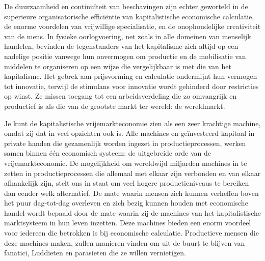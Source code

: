De duurzaamheid en continuïteit van beschavingen zijn echter geworteld in de superieure organisatorische efficiëntie van kapitalistische economische calculatie, de enorme voordelen van vrijwillige specialisatie, en de onophoudelijke creativiteit van de mens. In fysieke oorlogvoering, net zoals in alle domeinen van menselijk handelen, bevinden de tegenstanders van het kapitalisme zich altijd op een nadelige positie vanwege hun onvermogen om productie en de mobilisatie van middelen te organiseren op een wijze die vergelijkbaar is met die van het kapitalisme. Het gebrek aan prijsvorming en calculatie ondermijnt hun vermogen tot innovatie, terwijl de stimulans voor innovatie wordt gehinderd door restricties op winst. Ze missen toegang tot een arbeidsverdeling die zo omvangrijk en productief is als die van de grootste markt ter wereld: de wereldmarkt.

Je kunt de kapitalistische vrijemarkteconomie zien als een zeer krachtige machine, omdat zij dat in veel opzichten ook is. Alle machines en geïnvesteerd kapitaal in private handen die gezamenlijk worden ingezet in productieprocessen, werken samen binnen één economisch systeem: de uitgebreide orde van de vrijemarkteconomie. De mogelijkheid om wereldwijd miljarden machines in te zetten in productieprocessen die allemaal met elkaar zijn verbonden en van elkaar afhankelijk zijn, stelt ons in staat om veel hogere productieniveaus te bereiken dan eender welk alternatief. De mate waarin mensen zich kunnen verheffen boven het puur dag-tot-dag  overleven en zich bezig kunnen houden met economische handel wordt bepaald door de mate waarin zij de machines van het kapitalistische marktsysteem in hun leven inzetten. Deze machines bieden een enorm voordeel voor iedereen die betrokken is bij economische calculatie. Productieve mensen die deze machines maken, zullen manieren vinden om uit de buurt te blijven van fanatici, Luddieten en parasieten die ze willen vernietigen.

